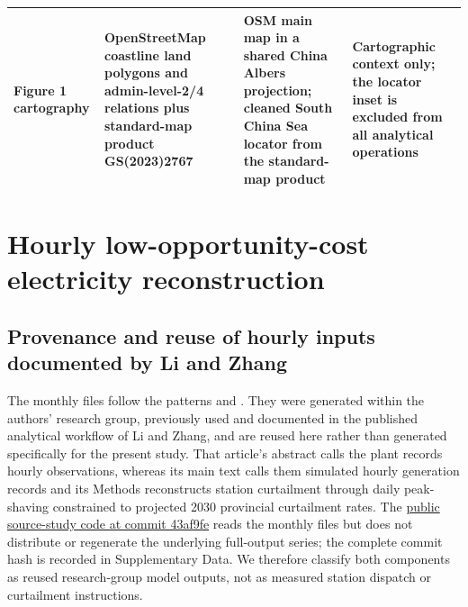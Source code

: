 \documentclass[pdflatex,sn-nature]{sn-jnl}
\begin{document}
\begin{table}[t]
\begin{tabularx}{\textwidth}{>{\raggedright\arraybackslash}p{}>{\raggedright\arraybackslash}p{}>{\raggedright\arraybackslash}X>{\raggedright\arraybackslash}p{}}
Figure 1 cartography & OpenStreetMap coastline land polygons and admin-level-2/4 relations plus standard-map product GS(2023)2767\cite{osmcoast,mnrmap2023} & OSM main map in a shared China Albers projection; cleaned South China Sea locator from the standard-map product & Cartographic context only; the locator inset is excluded from all analytical operations \\
\bottomrule
\end{tabularx}
\end{table}

\section{Hourly low-opportunity-cost electricity reconstruction}\label{sec:hourly}

\subsection{Provenance and reuse of hourly inputs documented by Li and Zhang}

The monthly files follow the patterns  and . They were generated within the authors' research group, previously used and documented in the published analytical workflow of Li and Zhang\cite{li2026}, and are reused here rather than generated specifically for the present study. That article's abstract calls the plant records hourly observations, whereas its main text calls them simulated hourly generation records and its Methods reconstructs station curtailment through daily peak-shaving constrained to projected 2030 provincial curtailment rates. The \href{https://github.com/Lynn20001130/-hydrogen-blending-analysis/tree/43af9fef041a7c55ca154cc6a40c5d339c23c521}{public source-study code at commit 43af9fe} reads the monthly files but does not distribute or regenerate the underlying full-output series; the complete commit hash is recorded in Supplementary Data. We therefore classify both components as reused research-group model outputs, not as measured station dispatch or curtailment instructions.
\end{document}
